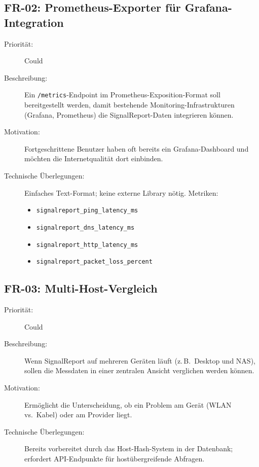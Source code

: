 \subsection{FR-02: Prometheus-Exporter für Grafana-Integration}
\begin{description}
  \item[Priorität:] Could
  \item[Beschreibung:] Ein \texttt{/metrics}-Endpoint im Prometheus-Exposition-Format soll
    bereitgestellt werden, damit bestehende Monitoring-Infrastrukturen (Grafana, Prometheus)
    die SignalReport-Daten integrieren können.
  \item[Motivation:] Fortgeschrittene Benutzer haben oft bereits ein Grafana-Dashboard und
    möchten die Internetqualität dort einbinden.
  \item[Technische Überlegungen:] Einfaches Text-Format; keine externe Library nötig.
    Metriken:
    \begin{itemize}[nosep]
      \item \texttt{signalreport\_ping\_latency\_ms}
      \item \texttt{signalreport\_dns\_latency\_ms}
      \item \texttt{signalreport\_http\_latency\_ms}
      \item \texttt{signalreport\_packet\_loss\_percent}
    \end{itemize}
\end{description}

\subsection{FR-03: Multi-Host-Vergleich}
\begin{description}
  \item[Priorität:] Could
  \item[Beschreibung:] Wenn SignalReport auf mehreren Geräten läuft (z.\,B.\ Desktop und NAS),
    sollen die Messdaten in einer zentralen Ansicht verglichen werden können.
  \item[Motivation:] Ermöglicht die Unterscheidung, ob ein Problem am Gerät (WLAN vs.\
    Kabel) oder am Provider liegt.
  \item[Technische Überlegungen:] Bereits vorbereitet durch das Host-Hash-System in der
    Datenbank; erfordert API-Endpunkte für hostübergreifende Abfragen.
\end{description}

